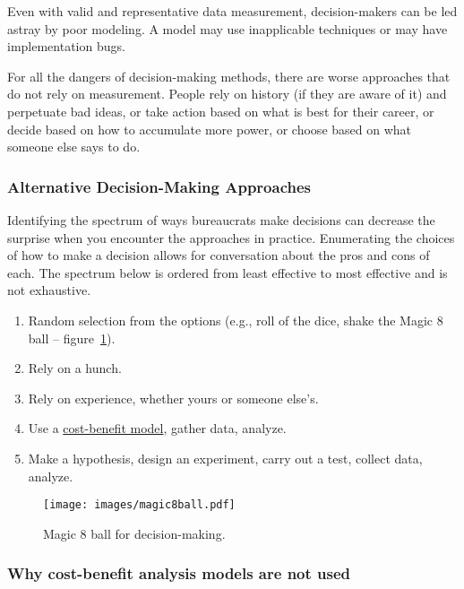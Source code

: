 Even with valid and representative data measurement, decision-makers can be led astray by poor modeling. A model may use inapplicable techniques or may have implementation bugs.

For all the dangers of decision-making methods, there are worse approaches that do not rely on measurement. People rely on history (if they are aware of it) and perpetuate bad ideas, or take action based on what is best for their career, or decide based on how to accumulate more power, or choose based on what someone else says to do.  

\subsubsection{Alternative Decision-Making Approaches}
Identifying the spectrum of ways bureaucrats make decisions can decrease the surprise when you encounter the approaches in practice. 
Enumerating the choices of how to make a decision allows for conversation about the pros and cons of each. The spectrum below is ordered from least effective to most effective and is not exhaustive.
\begin{enumerate}
    \item Random selection from the options (e.g., roll of the dice, shake the Magic 8 ball -- figure~\ref{fig:magic8ball}).
    \item Rely on a hunch.
    \item Rely on experience, whether yours or someone else's.
    \item Use a \href{https://en.wikipedia.org/wiki/Cost\%E2\%80\%93benefit_analysis}{cost-benefit model}, 
    gather data, analyze.
    \item Make a hypothesis, design an experiment, carry out a test, collect data, analyze.
\end{enumerate}

\begin{figure}
    \centering
    \texttt{[image: images/magic8ball.pdf]}
    \caption{Magic 8 ball for decision-making.}
    \label{fig:magic8ball}
\end{figure}

\subsubsection{Why cost-benefit analysis models are not used}


